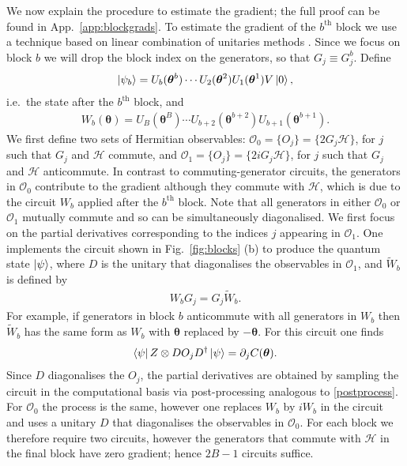 \documentclass[a4paper,twocolumn,11pt]{quantumarticle}
\renewcommand{\vec}{\boldsymbol}
\begin{document}
We now explain the procedure to estimate the gradient; the full proof can be found in App.\ \ref{app:blockgrads}. To estimate the gradient of the $b^{\text{th}}$ block we use a technique based on linear combination of unitaries methods \cite{childs2012hamiltonian}. Since we focus on block $b$ we will drop the block index on the generators, so that $G_j\equiv G_j^b$. Define 
\begin{align}
\ket{\psi_b}=U_b(\vec{\theta}^b)\cdots U_2(\vec{\theta}^2)U_1(\vec{\theta}^1)V\ket{0},   
\end{align}
i.e.\ the state after the $b^{\text{th}}$ block, and 
\begin{align}\label{Wbdef}
    W_b(\vec{\theta}) = U_B(\vec{\theta}^B)\cdots U_{b+2}(\vec{\theta}^{b+2})U_{b+1}(\vec{\theta}^{b+1}).
\end{align}
We first define two sets of Hermitian observables: $\mathcal{O}_0 = \{O_j\} = \{2G_j\mathcal{H}\}$, for $j$ such that $G_j$ and $\mathcal{H}$ commute, and $\mathcal{O}_1 = \{O_j\} = \{2iG_j\mathcal{H}\}$, for $j$ such that $G_j$ and $\mathcal{H}$ anticommute.
In contrast to commuting-generator circuits, the generators in $\mathcal{O}_0$ contribute to the gradient although they commute with $\mathcal{H}$, which is due to the circuit $W_b$ applied after the $b^{\text{th}}$ block.
Note that all generators in either $\mathcal{O}_0$ or $\mathcal{O}_1$ mutually commute and so can be simultaneously diagonalised. We first focus on the partial derivatives corresponding to the indices $j$ appearing in $\mathcal{O}_1$. One implements the circuit shown in Fig.\ \ref{fig:blocks} (b) to produce the quantum state $\ket{\psi}$, where $D$ is the unitary that diagonalises the observables in $\mathcal{O}_1$, and $\tilde{W}_b$ is defined by 
\begin{align}\label{Wbtildedef}
    W_bG_j = G_j\tilde{W}_b.
\end{align}
For example, if generators in block $b$ anticommute with all generators in $W_b$ then $\tilde{W}_b$ has the same form as $W_b$ with $\vec{\theta}$ replaced by $-\vec{\theta}$. 
For this circuit one finds 
\begin{align}
    \bra{\psi} Z\otimes DO_jD^\dagger\ket{\psi}=\partial_j C(\vec{\theta}).
\end{align}
Since $D$ diagonalises the $O_j$, the partial derivatives are obtained by sampling the circuit in the computational basis via post-processing analogous to \eqref{postprocess}. For $\mathcal{O}_0$ the process is the same, however one replaces $W_b$ by $iW_b$ in the circuit and uses a unitary $D$ that diagonalises the observables in $\mathcal{O}_0$. For each block we therefore require two circuits, however the generators that commute with $\mathcal{H}$ in the final block have zero gradient; hence $2B-1$ circuits suffice. 
\end{document}
